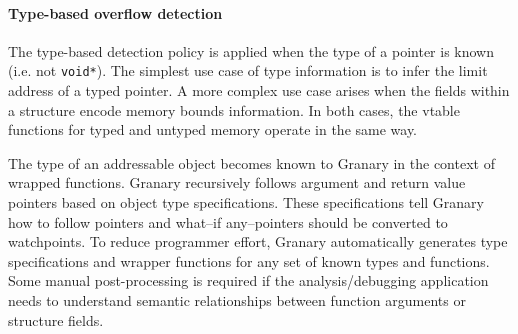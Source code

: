 \documentclass[letterpaper,twocolumn,10pt]{article}
\newcommand{\comment}[1]{}
\begin{document}
\paragraph{Type-based overflow detection}
The type-based detection policy is applied when the type of a pointer is known (i.e. not \texttt{void*}). The simplest use case of type information is to infer the limit address of a typed pointer. A more complex use case arises when the fields within a structure encode memory bounds information. In both cases, the vtable functions for typed and untyped memory operate in the same way.


The type of an addressable object becomes known to Granary in the context of wrapped functions. Granary recursively follows argument and return value pointers based on object type specifications. These specifications tell Granary how to follow pointers and what--if any--pointers should be converted to watchpoints. To reduce programmer effort, Granary automatically generates type specifications and wrapper functions for any set of known types and functions. Some manual post-processing is required if the analysis/debugging application needs to understand semantic relationships between function arguments or structure fields. \comment{Automating this process was an important goal of Granary because of Granary wraps all (approx. 6,000) exported kernel functions.}


\end{document}
